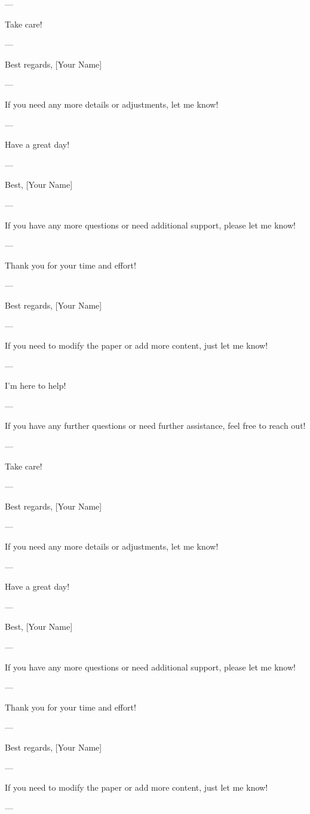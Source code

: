 --- 

Take care! 

--- 

Best regards,  
[Your Name] 

--- 

If you need any more details or adjustments, let me know! 

--- 

Have a great day! 

--- 

Best,  
[Your Name] 

--- 

If you have any more questions or need additional support, please let me know! 

--- 

Thank you for your time and effort! 

--- 

Best regards,  
[Your Name] 

--- 

If you need to modify the paper or add more content, just let me know! 

--- 

I'm here to help! 

--- 

If you have any further questions or need further assistance, feel free to reach out! 

--- 

Take care! 

--- 

Best regards,  
[Your Name] 

--- 

If you need any more details or adjustments, let me know! 

--- 

Have a great day! 

--- 

Best,  
[Your Name] 

--- 

If you have any more questions or need additional support, please let me know! 

--- 

Thank you for your time and effort! 

--- 

Best regards,  
[Your Name] 

--- 

If you need to modify the paper or add more content, just let me know! 

--- 

